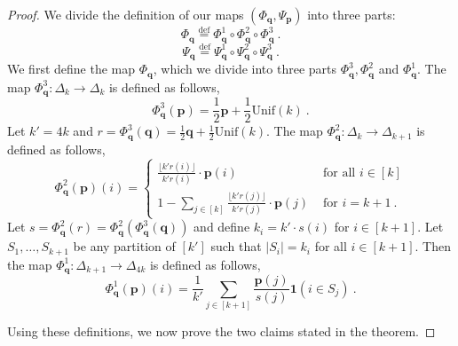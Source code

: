 \documentclass[10pt]{article} %
\theoremstyle{plain}
\newcommand{\bp}{\textbf{p}}
\newcommand{\unik}{\mathrm{Unif}(k)}%
\newcommand{\bq}{\textbf{q}}
\newcommand{\defeq}{\stackrel{\mathrm{def}}{=}}
\begin{document}
\thmidentouni*
\begin{proof}
	We divide the definition of our maps $(\Phi_{\bq},\Psi_{\bp})$ into three parts:
	$$\Phi_{\bq} \defeq \Phi_{\bq}^1 \circ \Phi_{\bq}^2 \circ \Phi_{\bq}^3~.$$
	$$\Psi_{\bq} \defeq \Psi_{\bq}^1 \circ \Psi_{\bq}^2 \circ \Psi_{\bq}^3~.$$
	We first define the map $\Phi_{\bq}$, which we divide into three parts $\Phi_{\bq}^3,\Phi_{\bq}^2$ and $\Phi_{\bq}^1$. The map $\Phi_{\bq}^3: \Delta_k\rightarrow \Delta_k$ is defined as follows,
	$$\Phi_{\bq}^3(\bp)=\frac{1}{2}\bp + \frac{1}{2}\unik~.$$
	Let $k'=4k$ and $r=\Phi_{\bq}^3(\bq)=\frac{1}{2}\bq+\frac{1}{2}\unik$. The map $\Phi_{\bq}^2: \Delta_k\rightarrow \Delta_{k+1}$ is defined as follows,
	\begin{equation}
		\Phi_{\bq}^2(\bp)(i)=
		\begin{cases}
			\frac{\lfloor k'r(i)\rfloor}{k'r(i)} \cdot \bp(i)  & \text{ for all } i \in [k]\\
			1-\sum_{j\in [k]}\frac{\lfloor k'r(j)\rfloor}{k'r(j)} \cdot \bp(j)& \text{ for } i=k+1~.
		\end{cases}
	\end{equation}
	Let $s=\Phi_{\bq}^2(r)=\Phi_{\bq}^2(\Phi_{\bq}^3(\bq))$ and define $k_i=k' \cdot s(i)$ for $i\in [k+1]$. Let $S_1,\dots,S_{k+1} $ be any partition of $[k']$ such that $|S_i|=k_i$ for all $i\in [k+1]$. Then the map $\Phi_{\bq}^1:\Delta_{k+1}\rightarrow \Delta_{4k}$ is defined as follows,
	$$\Phi_{\bq}^1(\bp)(i)=\frac{1}{k'}\sum_{j \in [k+1]}\frac{\bp(j)}{s(j)}\textbf{1}(i \in S_j)~.$$
	
	Using these definitions, we now prove the two claims stated in the theorem.

\end{proof}
\end{document}
